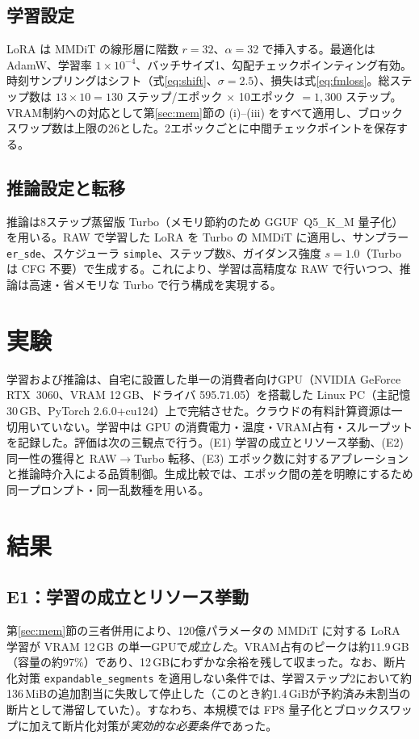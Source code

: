 \documentclass[10pt,twocolumn]{ltjsarticle}
\begin{document}
\subsection{学習設定}
LoRA は MMDiT の線形層に階数 $r=32$、$\alpha=32$ で挿入する。最適化は AdamW、学習率 $1\times10^{-4}$、バッチサイズ1、勾配チェックポインティング有効。時刻サンプリングはシフト（式\eqref{eq:shift}、$\sigma=2.5$）、損失は式\eqref{eq:fmloss}。総ステップ数は $13\times10=130$ ステップ/エポック $\times$ 10エポック $=1{,}300$ ステップ。VRAM制約への対応として第\ref{sec:mem}節の (i)--(iii) をすべて適用し、ブロックスワップ数は上限の26とした。2エポックごとに中間チェックポイントを保存する。

\subsection{推論設定と転移}
推論は8ステップ蒸留版 Turbo（メモリ節約のため GGUF~Q5\_K\_M 量子化）を用いる。RAW で学習した LoRA を Turbo の MMDiT に適用し、サンプラー \texttt{er\_sde}、スケジューラ \texttt{simple}、ステップ数8、ガイダンス強度 $s=1.0$（Turbo は CFG 不要）で生成する。これにより、学習は高精度な RAW で行いつつ、推論は高速・省メモリな Turbo で行う構成を実現する。

\section{実験}
学習および推論は、自宅に設置した単一の消費者向けGPU（NVIDIA GeForce RTX~3060、VRAM 12\,GB、ドライバ 595.71.05）を搭載した Linux PC（主記憶 30\,GB、PyTorch 2.6.0+cu124）上で完結させた。クラウドの有料計算資源は一切用いていない。学習中は GPU の消費電力・温度・VRAM占有・スループットを記録した。評価は次の三観点で行う。(E1) 学習の成立とリソース挙動、(E2) 同一性の獲得と RAW$\to$Turbo 転移、(E3) エポック数に対するアブレーションと推論時介入による品質制御。生成比較では、エポック間の差を明瞭にするため同一プロンプト・同一乱数種を用いる。

\section{結果}
\label{sec:results}
\subsection{E1：学習の成立とリソース挙動}
第\ref{sec:mem}節の三者併用により、120億パラメータの MMDiT に対する LoRA 学習が VRAM 12\,GB の単一GPUで\emph{成立した}。VRAM占有のピークは約11.9\,GB（容量の約97\%）であり、12\,GBにわずかな余裕を残して収まった。なお、断片化対策 \texttt{expandable\_segments} を適用しない条件では、学習ステップ2において約136\,MiBの追加割当に失敗して停止した（このとき約1.4\,GiBが予約済み未割当の断片として滞留していた）。すなわち、本規模では FP8 量子化とブロックスワップに加えて断片化対策が\emph{実効的な必要条件}であった。
\end{document}

